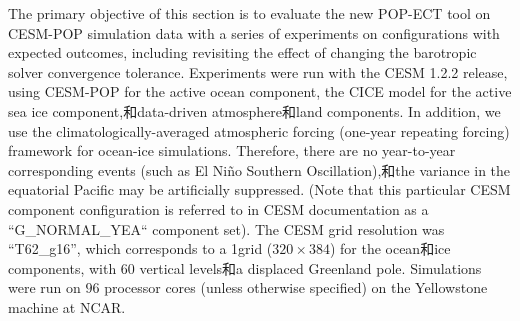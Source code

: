 

The primary objective of this section is to evaluate the new POP-ECT tool on CESM-POP simulation data with a series of experiments on configurations with expected outcomes, including revisiting the effect of changing the barotropic solver convergence tolerance. Experiments were run with the CESM 1.2.2 release, using CESM-POP for the active ocean component, the CICE model for the active sea ice component,和data-driven atmosphere和land components. In addition, we use the climatologically-averaged atmospheric forcing (one-year repeating forcing) framework for ocean-ice simulations. Therefore, there are no year-to-year corresponding events (such as El Ni\~{n}o Southern Oscillation),和the variance in the equatorial Pacific may be artificially suppressed. (Note that this particular CESM component configuration is referred to in CESM documentation as a ``G\_NORMAL\_YEA`` component set). The CESM grid resolution was “T62\_g16”, which corresponds to a 1\degree grid ($320 \times 384$) for the ocean和ice components, with $60$ vertical levels和a displaced Greenland pole. Simulations were run on $96$ processor cores (unless otherwise specified) on the Yellowstone machine at NCAR. 


